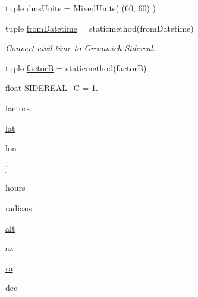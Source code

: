 \begin{DoxyCompactItemize}
\item 
tuple \hyperlink{namespaceamonpy_1_1sim_1_1sidereal__m_a76e1c6a5ad60ea1da2d1b2077ec8941c}{dms\-Units} = \hyperlink{classamonpy_1_1sim_1_1sidereal__m_1_1_mixed_units}{Mixed\-Units}( (60, 60) )
\item 
tuple \hyperlink{namespaceamonpy_1_1sim_1_1sidereal__m_ac885ba22bff0d27084aaf4aede91e5bc}{from\-Datetime} = staticmethod(from\-Datetime)
\begin{DoxyCompactList}\small\item\em Convert civil time to Greenwich Sidereal. \end{DoxyCompactList}\item 
tuple \hyperlink{namespaceamonpy_1_1sim_1_1sidereal__m_a5d37cf446e5ecb640438e8248775c159}{factor\-B} = staticmethod(factor\-B)
\item 
float \hyperlink{namespaceamonpy_1_1sim_1_1sidereal__m_a5fd5697d2163323b9ecd8d2865fcda6c}{S\-I\-D\-E\-R\-E\-A\-L\-\_\-\-C} = 1.
\item 
\hyperlink{namespaceamonpy_1_1sim_1_1sidereal__m_aa5538735fe4f82de2a5c9fb7da460471}{factors}
\item 
\hyperlink{namespaceamonpy_1_1sim_1_1sidereal__m_a9cb235680ba0dd6b44d2115b59486c07}{lat}
\item 
\hyperlink{namespaceamonpy_1_1sim_1_1sidereal__m_ab46193951f3647dcd0147e60f560a572}{lon}
\item 
\hyperlink{namespaceamonpy_1_1sim_1_1sidereal__m_aa758d2473c2479088d5bbda5e961a8e3}{j}
\item 
\hyperlink{namespaceamonpy_1_1sim_1_1sidereal__m_ab57a43b87f961c10d7510aba50c02942}{hours}
\item 
\hyperlink{namespaceamonpy_1_1sim_1_1sidereal__m_a37d5a86d629c9df7aa8116d898e19f50}{radians}
\item 
\hyperlink{namespaceamonpy_1_1sim_1_1sidereal__m_ab721886185ef9c5711e34db16db8dd4a}{alt}
\item 
\hyperlink{namespaceamonpy_1_1sim_1_1sidereal__m_a32333e199bbeaea7ea9ff8766639f54b}{az}
\item 
\hyperlink{namespaceamonpy_1_1sim_1_1sidereal__m_a84b078ad11be9bb8a707b09e4fc9a43d}{ra}
\item 
\hyperlink{namespaceamonpy_1_1sim_1_1sidereal__m_aee6dccac434aa3a594b8821470a6ee7b}{dec}
\end{DoxyCompactItemize}


